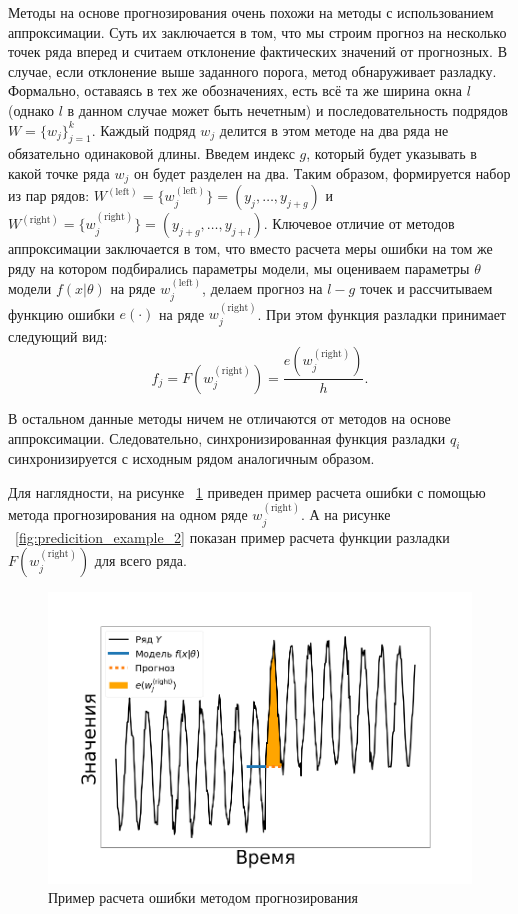 \documentclass[%
12pt,
master,  %
natbib,      %
subf,        %
substylefile = spbu.rtx,
href,        %
colorlinks,  %
]{disser}
\begin{document}
Методы на основе прогнозирования очень похожи на методы с использованием аппроксимации. Суть их заключается в том, что мы строим прогноз на несколько точек ряда вперед и считаем отклонение фактических значений от прогнозных. В случае, если отклонение выше заданного порога, метод обнаруживает разладку.
Формально, оставаясь в тех же обозначениях, есть всё та же ширина окна $l$ (однако $l$ в данном случае может быть нечетным) и последовательность подрядов $W = \{ w_j \}_{j=1}^k$. Каждый подряд  $w_j$ делится в этом методе на два ряда не обязательно одинаковой длины. Введем индекс $g$, который будет указывать в какой точке ряда $w_j$ он будет разделен на два. Таким образом, формируется набор из пар рядов:  $ W^{\mathrm{(left)}} = \{w_j^{\mathrm{(left)}} \}  =  (y_j, \dots, y_{j+g})$ и $W^{\mathrm{(right)}} = \{w_j^{\mathrm{(right)}} \} = (y_{j+g}, \dots, y_{j+l})$. Ключевое отличие от методов аппроксимации заключается в том, что вместо расчета меры ошибки на том же ряду на котором подбирались параметры модели, мы оцениваем параметры $\theta$ модели $f(x|\theta)$ на ряде $ w_j^{\mathrm{(left)}} $, делаем прогноз на $ l - g $ точек и рассчитываем функцию ошибки $ e(\cdot) $ на ряде $ w_j^{\mathrm{(right)}} $. При этом функция разладки принимает следующий вид:
	\begin{equation*}
	 f_j = F(w_j^{\mathrm{(right)}}) = \frac{e(w_j^{\mathrm{(right)}})}{h}.
	 \end{equation*}

В остальном данные методы ничем не отличаются от методов на основе аппроксимации. Следовательно, синхронизированная функция разладки $q_i$ синхронизируется с исходным рядом аналогичным образом.

Для наглядности, на рисунке ~\ref{fig:predicition_example_1} приведен пример расчета ошибки с помощью метода прогнозирования на одном ряде  $ w_j^{\mathrm{(right)}} $. А на рисунке ~\ref{fig:predicition_example_2} показан пример расчета функции разладки $ F(w_j^{\mathrm{(right)}}) $ для всего ряда.

\begin{figure}[!hhh]
	\begin{center}
		\includegraphics[width=12cm]{approaches_first_4_ru}
	\end{center}
	\vspace{-5mm}\caption{Пример расчета ошибки методом прогнозирования}
	\label{fig:predicition_example_1}
\end{figure}
\end{document}
